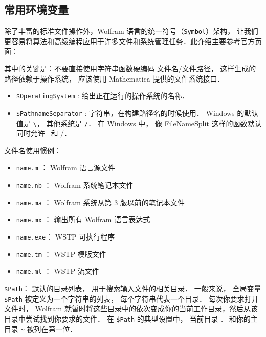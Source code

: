 
\begin{issues}
\issueDraft
\issueTODO
\end{issues}

\subsection{常用环境变量}

除了丰富的标准文件操作外，Wolfram 语言的统一符号（\verb`Symbol`）架构，
让我们更容易将算法和高级编程应用于许多文件和系统管理任务．此介绍主要参考官方页面：


其中的关键是：不要直接使用字符串函数硬编码 文件名/文件路径， 
这样生成的路径依赖于操作系统， 应该使用 Mathematica 提供的文件系统接口．

\begin{itemize}
\item \verb`$OperatingSystem` : 给出正在运行的操作系统的名称．
\item \verb`$PathnameSeparator` : 字符串，在构建路径名的时候使用． 
Windows 的默认值是 \verb|\|， 其他系统是 \verb|/|．
在 Windows 中， 像 FileNameSplit 这样的函数默认同时允许 \ 和 /．
\end{itemize}

文件名使用惯例：

\begin{itemize}
\item \verb`name.m`  ： Wolfram 语言源文件
\item \verb`name.nb` ： Wolfram 系统笔记本文件
\item \verb`name.ma` ： Wolfram 系统从第 $3$ 版以前的笔记本文件
\item \verb`name.mx` ： 输出所有 Wolfram 语言表达式
\item \verb`name.exe`： WSTP 可执行程序
\item \verb`name.tm` ： WSTP 模版文件
\item \verb`name.ml` ： WSTP 流文件
\end{itemize}


\verb`$Path`： 默认的目录列表， 用于搜索输入文件的相关目录． 
一般来说， 全局变量 \verb`$Path` 被定义为一个字符串的列表， 每个字符串代表一个目录．
每次你要求打开文件时， Wolfram 就暂时将这些目录中的依次变成你的当前工作目录，然后从该目录中尝试找到你要求的文件．
在 \verb`$Path` 的典型设置中， 当前目录 \verb`．` 和你的主目录 \verb`~` 被列在第一位．


